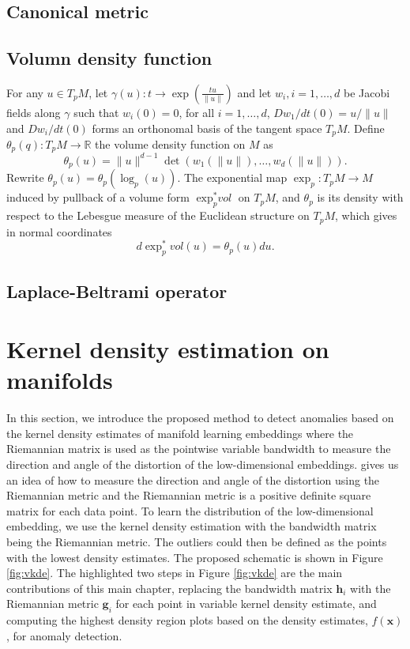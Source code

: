 \documentclass[11pt,a4paper,]{article}
\begin{document}
\hypertarget{canonical-metric}{%
\subsection{Canonical metric}\label{canonical-metric}}

\hypertarget{volumn-density-function}{%
\subsection{Volumn density function}\label{volumn-density-function}}

For any \(u \in T_pM\), let \(\gamma(u): t \rightarrow \exp(\frac{tu}{\|u\|})\) and let \(w_i, i=1,\dots,d\) be Jacobi fields along \(\gamma\) such that \(w_i(0)=0\), for all \(i=1,\dots,d\), \(Dw_1/dt(0)=u/\|u\|\) and \(Dw_i/dt(0)\) forms an orthonomal basis of the tangent space \(T_pM\).
Define \(\theta_p(q): T_pM \rightarrow \mathbb{R}\) the volume density function on \(M\) as
\[
\theta_p(u) = \|u\|^{d-1} \det(w_1(\|u\|),\dots,w_d(\|u\|)).
\]
Rewrite \(\theta_p(u) = \theta_p(\log_p(u))\).
The exponential map \(\exp_p: T_pM \rightarrow M\) induced by pullback of a volume form \(\exp_p^*\textit{vol}\) on \(T_pM\), and
\(\theta_p\) is its density with respect to the Lebesgue measure of the Euclidean structure on \(T_pM\), which gives in normal coordinates
\[
d\exp_p^*vol(u) = \theta_p(u)du.
\]

\hypertarget{laplace-beltrami-operator}{%
\subsection{Laplace-Beltrami operator}\label{laplace-beltrami-operator}}

\hypertarget{vkde}{%
\section{Kernel density estimation on manifolds}\label{vkde}}

In this section, we introduce the proposed method to detect anomalies based on the kernel density estimates of manifold learning embeddings where the Riemannian matrix is used as the pointwise variable bandwidth to measure the direction and angle of the distortion of the low-dimensional embeddings. \textcite{Perrault-Joncas2013-pq} gives us an idea of how to measure the direction and angle of the distortion using the Riemannian metric and the Riemannian metric is a positive definite square matrix for each data point. To learn the distribution of the low-dimensional embedding, we use the kernel density estimation with the bandwidth matrix being the Riemannian metric. The outliers could then be defined as the points with the lowest density estimates. The proposed schematic is shown in Figure \ref{fig:vkde}. The highlighted two steps in Figure \ref{fig:vkde} are the main contributions of this main chapter, replacing the bandwidth matrix \(\pmb{h}_i\) with the Riemannian metric \(\pmb{g}_i\) for each point in variable kernel density estimate, and computing the highest density region plots based on the density estimates, \(\hat{f}(\pmb{x})\), for anomaly detection.
\end{document}
